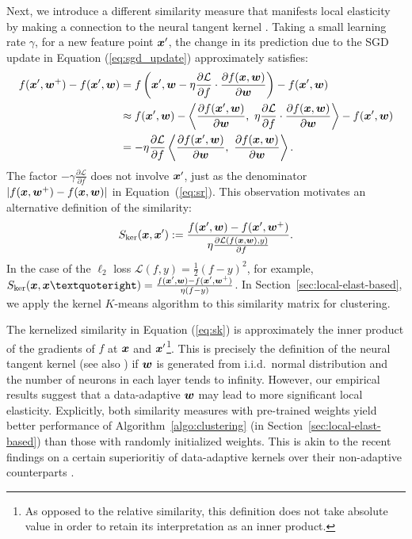 Next, we introduce a different similarity measure that manifests local elasticity by making a connection to the neural tangent kernel \citep{jacot2018neural}. Taking a small learning rate $\gamma$, for a new feature point $\bm{x}'$, the change in its prediction due to the SGD update in Equation (\ref{eq:sgd_update}) approximately satisfies:
\[
\begin{aligned}
f(\bm{x}', \bm{w}^+) - f(\bm{x}', \bm{w}) &= f\left(\bm{x}', \bm{w} - \eta \frac{\partial \mathcal{L}}{\partial f} \cdot \frac{\partial f(\bm{x}, \bm{w})}{\partial \bm{w}}\right)  - f(\bm{x}', \bm{w})\\
& \approx f(\bm{x}', \bm{w}) - \left\langle \frac{\partial f(\bm{x}', \bm{w})}{\partial \bm{w}}, ~ \eta \frac{\partial \mathcal{L}}{\partial f} \cdot \frac{\partial f(\bm{x}, \bm{w})}{\partial \bm{w}} \right\rangle - f(\bm{x}', \bm{w})\\
&= -\eta \frac{\partial \mathcal{L}}{\partial f} \left\langle \frac{\partial f(\bm{x}', \bm{w})}{\partial \bm{w}}, ~ \frac{\partial f(\bm{x}, \bm{w})}{\partial \bm{w}} \right\rangle.
\end{aligned}
\]
The factor $-\gamma \frac{\partial \mathcal{L}}{\partial f}$ does not involve $\bm{x}'$, just as the denominator $|f(\bm{x}, \bm{w}^+) - f(\bm{x},\bm{w})|$ in Equation~(\ref{eq:sr}). This observation motivates an alternative definition of the similarity:
\begin{equation}\label{eq:sk}
S_{\mathrm{ker}}(\bm{x}, \bm{x}'):= \frac{f(\bm{x}', \bm{w}) - f(\bm{x}', \bm{w}^+)}{\eta \frac{\partial \mathcal{L}(f(\bm{x}, \bm{w}), y)}{\partial f}}.
\end{equation}
In the case of the $\ell_2$ loss $\mathcal{L}(f, y) = \frac12 (f - y)^2$, for example, $\Sk(\mbf{x}, \mbf{x}’) = \frac{f(\mbf{x}', \mbf{w}) - f(\mbf{x}', \mbf{w}^+)}{\gamma (f - y)}$. In Section~\ref{sec:local-elast-based}, we apply the kernel $K$-means algorithm to this similarity matrix for clustering.

The kernelized similarity in Equation (\ref{eq:sk}) is approximately the inner product of the gradients of $f$ at $\bm{x}$ and $\bm{x}'$\footnote{As opposed to the relative similarity, this definition does not take absolute value in order to retain its interpretation as an inner product. }. This is precisely the definition of the neural tangent kernel \citep{jacot2018neural} (see also \citet{arora2019exact}) if $\bm{w}$ is generated from i.i.d.~normal distribution and the number of neurons in each layer tends to infinity. However, our empirical results suggest that a data-adaptive $\bm{w}$ may lead to more significant local elasticity. Explicitly, both similarity measures with pre-trained weights yield better performance of Algorithm~\ref{algo:clustering} (in Section~\ref{sec:local-elast-based}) than those with randomly initialized weights. This is akin to the recent findings on a certain superioritiy of data-adaptive kernels over their non-adaptive counterparts \citep{dou2019training}. 




